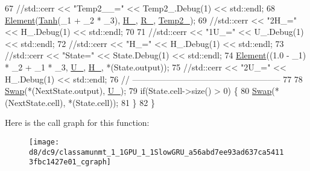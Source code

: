 \begin{DoxyCode}
67       \textcolor{comment}{//std::cerr << "Temp2\_\_=" << Temp2\_.Debug(1) << std::endl;}
68       \hyperlink{namespaceamunmt_1_1GPU_1_1mblas_adc0a1bee5e001b28e10bff88e940b284}{Element}(\hyperlink{namespacethrust_1_1detail_1_1functional_a565a36ed831a74fec50b00c921f669ba}{Tanh}(\_1 + \_2 * \_3), \hyperlink{classamunmt_1_1GPU_1_1SlowGRU_afbccdac0afde1ede4ff4f78e3c2421f7}{H\_}, \hyperlink{classamunmt_1_1GPU_1_1SlowGRU_a6149bb77260336fc2fcb996efb869894}{R\_}, \hyperlink{classamunmt_1_1GPU_1_1SlowGRU_a8db5f7a9fedce4e8ba545753e2e61c60}{Temp2\_});
69       \textcolor{comment}{//std::cerr << "2H\_=" << H\_.Debug(1) << std::endl;}
70 
71       \textcolor{comment}{//std::cerr << "1U\_=" << U\_.Debug(1) << std::endl;}
72       \textcolor{comment}{//std::cerr << "H\_=" << H\_.Debug(1) << std::endl;}
73       \textcolor{comment}{//std::cerr << "State=" << State.Debug(1) << std::endl;}
74       \hyperlink{namespaceamunmt_1_1GPU_1_1mblas_adc0a1bee5e001b28e10bff88e940b284}{Element}((1.0 - \_1) * \_2 + \_1 * \_3, \hyperlink{classamunmt_1_1GPU_1_1SlowGRU_a1fe150f08247927994f75bd79f27a127}{U\_}, \hyperlink{classamunmt_1_1GPU_1_1SlowGRU_afbccdac0afde1ede4ff4f78e3c2421f7}{H\_}, *(State.output));
75       \textcolor{comment}{//std::cerr << "2U\_=" << H\_.Debug(1) << std::endl;}
76       \textcolor{comment}{// -----------------------------------------------------}
77 
78       \hyperlink{namespaceamunmt_1_1GPU_1_1mblas_a88b723882ca7b614a20e6e9edb5c214b}{Swap}(*(NextState.output), \hyperlink{classamunmt_1_1GPU_1_1SlowGRU_a1fe150f08247927994f75bd79f27a127}{U\_});
79       \textcolor{keywordflow}{if}(State.cell->size() > 0) \{
80         \hyperlink{namespaceamunmt_1_1GPU_1_1mblas_a88b723882ca7b614a20e6e9edb5c214b}{Swap}(*(NextState.cell), *(State.cell));
81       \}
82     \}
\end{DoxyCode}


Here is the call graph for this function\+:
\nopagebreak
\begin{figure}[H]
\begin{center}
\leavevmode
\texttt{[image: d8/dc9/classamunmt\_1\_1GPU\_1\_1SlowGRU\_a56abd7ee93ad637ca54113fbc1427e01\_cgraph]}
\end{center}
\end{figure}


